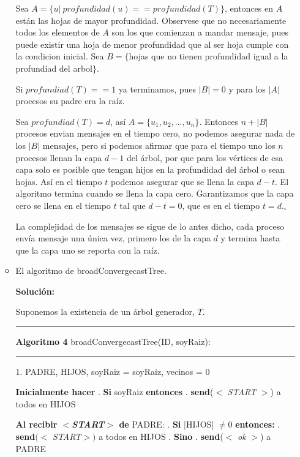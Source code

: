 \documentclass[8pt, letterpaper]{article}
\begin{document}
\begin{enumerate}
\begin{itemize}
  \hfill\break
  Sea $A=\{u|\ profundidad(u) == profundidad(T)\}$, entonces en $A$ están las
  hojas de mayor profundidad. Observese que no necesariamente todos los
  elementos de $A$ son los que comienzan a mandar mensaje, pues puede existir
  una hoja de menor profundidad que al ser hoja cumple con la condicion inicial.
  Sea $B=\{$hojas que no tienen profundidad igual a la profundiad del arbol$\}$.

  Si $profundiad(T) == 1$ ya terminamos, pues $|B| = 0$ y para los $|A|$
  procesos su padre era la raíz.

  Sea $profundiad(T) = d$, así $A=\{u_1, u_2, ..., u_n\}$. Entonces $n +|B|$
  procesos envian mensajes en el tiempo cero, no podemos asegurar nada de los
  $|B|$ mensajes, pero si podemos afirmar que para el tiempo uno
  los $n$ procesos llenan la capa $d-1$ del árbol, por que para 
  los vértices de esa capa solo es posible que tengan hijos en la profundidad
  del árbol o sean hojas. Así en el tiempo $t$ podemos asegurar que se llena
  la capa $d-t$. El algoritmo termina cuando se llena la capa cero. Garantizamos
  que la capa cero se llena en el tiempo $t$ tal que $d-t = 0$, que es en el
  tiempo $t=d._\square$

  \hfill\break
  La complejidad de los mensajes se sigue de lo antes dicho, cada proceso envía
  mensaje una única vez, primero los de la capa $d$  y termina hasta que la capa
  uno se reporta con la raíz.
  \newpage
  \rmfamily
\item El algoritmo de broadConvergecastTree.
  
  \hfill\break
  \ttfamily
  {\bf Solución:}
  
  Suponemos la existencia de un árbol generador, $T$.

  \rule{1\textwidth}{0.2mm}
  {\bf Algoritmo 4} broadConvergecastTree(ID, soyRaiz):
  \hfill\break
  \rule{1\textwidth}{0.2mm}
  1. PADRE, HIJOS, soyRaiz = soyRaiz, vecinos = 0
  
  \hfill\break
  \hspace*{.2cm} {\bf Inicialmente hacer}
  \hfill{}. {\bf Si} soyRaiz {\bf entonces}
  \hfill{}. \hspace{0.5cm} {\bf send}($<$ \textit{START} $>$) a todos en HIJOS
  \hfill\break
  
  \hspace{0.2cm} {\bf Al recibir $<${\it START}$>$ de } PADRE:
  \hfill{}. {\bf Si} |HIJOS| $\neq 0$ {\bf entonces:}
  \hfill{}. \hspace{.5cm} {\bf send}$(<$ {\it START}$>)$ a todos en HIJOS
  \hfill{}. {\bf Sino} 
  \hfill{}. \hspace{1cm} {\bf send}($<$ \textit{ok} $>$) a PADRE
  \hfill\break


\end{itemize}
\end{enumerate}
\end{document}

